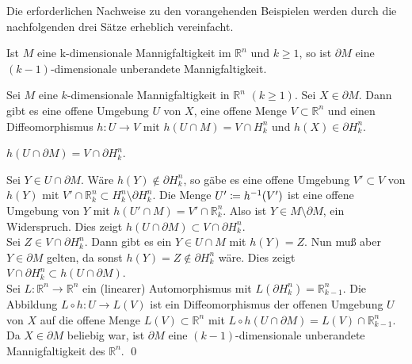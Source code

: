 \documentclass[a4paper,twoside,DIV15,BCOR12mm]{scrbook}
\begin{document}
\noindent
Die erforderlichen Nachweise zu den vorangehenden Beispielen werden durch die nachfolgenden 
drei Sätze erheblich vereinfacht.

\bigskip

\begin{satz}\label{Satz3.6.1} {Ist $M$ eine k-dimensionale 
Mannigfaltigkeit im ${\mathbb R}^{n}$ und $k \ge 1$, so ist $\partial 
M$ eine $(k-1)$-dimensionale unberandete Mannigfaltigkeit.}
\end{satz}



\bigskip

Sei $M$ eine $k$-dimensionale Mannigfaltigkeit in ${\mathbb R}^{n}$ 
$(k \ge 1)$. Sei $X \in \partial M$. Dann gibt es eine offene 
Umgebung $U$ von $X$, eine offene Menge $V \subset {\mathbb R}^{n}$ 
und einen Diffeomorphismus $h: U \to V$ mit $h(U \cap M) = V \cap 
H_{k}^{n}$ und $h(X) \in \partial H_{k}^{n}$. 

\bigskip

 $h(U \cap \partial M) = V \cap \partial 
H_{k}^{n}$.

\bigskip

 Sei $Y \in U \cap \partial M$. Wäre $h(Y) 
\notin \partial H_{k}^{n}$, so gäbe es eine offene Umgebung $V' 
\subset V$ von $h(Y)$ mit $V' \cap {\mathbb R}_{k}^{n} \subset 
H_{k}^{n} \setminus \partial H_{k}^{n}$. Die Menge $U' \da  h^{-1}(V')$ 
ist eine offene Umgebung von $Y$ mit $h(U' \cap M) = V' \cap {\mathbb 
R}_{k}^{n}$. Also ist $Y \in M \setminus \partial M$, ein Widerspruch. 
Dies zeigt $h(U \cap \partial M) \subset V \cap \partial H_{k}^{n}$.\\

\noindent
Sei $Z \in V \cap \partial H_{k}^{n}$. Dann gibt es ein $Y \in U \cap M$ mit $h(Y) = 
Z$. Nun muß aber $Y \in \partial M$ gelten, da sonst $h(Y) = Z 
\notin \partial H_{k}^{n}$ wäre. Dies zeigt $V \cap \partial 
H_{k}^{n} \subset h(U \cap \partial M)$.\\

\noindent
Sei $L: {\mathbb R}^{n} \to {\mathbb R}^{n}$ ein (linearer) 
Automorphismus mit $L(\partial H_{k}^{n}) = {\mathbb R}_{k-1}^{n}$. 
Die Abbildung $L \circ h: U \to L(V)$ ist ein Diffeomorphismus der 
offenen Umgebung $U$ von $X$ auf die offene Menge $L(V) \subset 
{\mathbb R}^{n}$ mit $L \circ h(U \cap \partial M) = L(V) \cap 
{\mathbb R}_{k-1}^{n}$. Da $X \in \partial M$ beliebig war, ist 
$\partial M$ eine $(k-1)$-dimensionale unberandete Mannigfaltigkeit 
des ${\mathbb R}^{n}$. \qed\\
\end{document}
